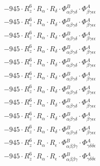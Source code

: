 \documentclass{article}
\begin{document}
\begin{subequations}
\begin{gather}
\begin{array}{c}
 \\[0.2em] 		 - 945 \cdot R_{z}^{6} \cdot R_{\alpha{}} \cdot R_{\delta{}} \cdot \Phi{}^{B}_{\alpha{}\beta{}\gamma{}\delta{}} \cdot \Phi{}^{A}_{\beta{}\gamma{}\epsilon{}\epsilon{}} 
 \\[0.2em] 		 - 945 \cdot R_{z}^{6} \cdot R_{\alpha{}} \cdot R_{\delta{}} \cdot \Phi{}^{B}_{\alpha{}\beta{}\gamma{}\delta{}} \cdot \Phi{}^{A}_{\beta{}\gamma{}\epsilon{}\epsilon{}} 
 \\[0.2em] 		 - 945 \cdot R_{z}^{6} \cdot R_{\alpha{}} \cdot R_{\delta{}} \cdot \Phi{}^{B}_{\alpha{}\beta{}\gamma{}\delta{}} \cdot \Phi{}^{A}_{\beta{}\gamma{}\epsilon{}\epsilon{}} 
 \\[0.2em] 		 - 945 \cdot R_{z}^{6} \cdot R_{\alpha{}} \cdot R_{\delta{}} \cdot \Phi{}^{B}_{\alpha{}\beta{}\gamma{}\delta{}} \cdot \Phi{}^{A}_{\beta{}\gamma{}\epsilon{}\epsilon{}} 
 \\[0.2em] 		 - 945 \cdot R_{z}^{6} \cdot R_{\alpha{}} \cdot R_{\delta{}} \cdot \Phi{}^{B}_{\alpha{}\beta{}\gamma{}\delta{}} \cdot \Phi{}^{A}_{\beta{}\gamma{}\epsilon{}\epsilon{}} 
 \\[0.2em] 		 - 945 \cdot R_{z}^{6} \cdot R_{\alpha{}} \cdot R_{\delta{}} \cdot \Phi{}^{B}_{\alpha{}\beta{}\gamma{}\delta{}} \cdot \Phi{}^{A}_{\beta{}\gamma{}\epsilon{}\epsilon{}} 
 \\[0.2em] 		 - 945 \cdot R_{z}^{6} \cdot R_{\alpha{}} \cdot R_{\delta{}} \cdot \Phi{}^{B}_{\alpha{}\beta{}\gamma{}\delta{}} \cdot \Phi{}^{A}_{\beta{}\gamma{}\epsilon{}\epsilon{}} 
 \\[0.2em] 		 - 945 \cdot R_{z}^{6} \cdot R_{\alpha{}} \cdot R_{\delta{}} \cdot \Phi{}^{B}_{\alpha{}\beta{}\gamma{}\delta{}} \cdot \Phi{}^{A}_{\beta{}\gamma{}\epsilon{}\epsilon{}} 
 \\[0.2em] 		 - 945 \cdot R_{z}^{6} \cdot R_{\alpha{}} \cdot R_{\delta{}} \cdot \Phi{}^{B}_{\alpha{}\beta{}\gamma{}\delta{}} \cdot \Phi{}^{A}_{\beta{}\gamma{}\epsilon{}\epsilon{}} 
 \\[0.2em] 		 - 945 \cdot R_{z}^{6} \cdot R_{\alpha{}} \cdot R_{\delta{}} \cdot \Phi{}^{B}_{\alpha{}\beta{}\gamma{}\delta{}} \cdot \Phi{}^{A}_{\beta{}\gamma{}\epsilon{}\epsilon{}} 
 \\[0.2em] 		 - 945 \cdot R_{z}^{6} \cdot R_{\alpha{}} \cdot R_{\epsilon{}} \cdot \Phi{}^{B}_{\alpha{}\beta{}\beta{}\gamma{}} \cdot \Phi{}^{A}_{\gamma{}\delta{}\delta{}\epsilon{}} 
 \\[0.2em] 		 - 945 \cdot R_{z}^{6} \cdot R_{\alpha{}} \cdot R_{\epsilon{}} \cdot \Phi{}^{B}_{\alpha{}\beta{}\beta{}\gamma{}} \cdot \Phi{}^{A}_{\gamma{}\delta{}\delta{}\epsilon{}} 

\end{array}
\end{gather}
\end{subequations}
\end{document}
